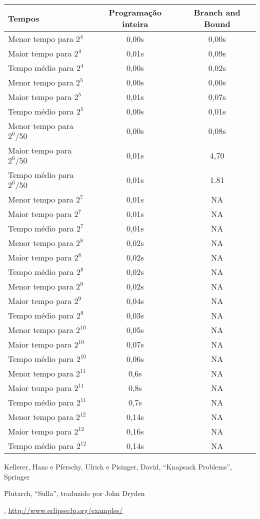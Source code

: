 \documentclass{article}
\begin{document}
\begin{center}
  \bgroup {}
  \begin{tabular}{| l | c | c |}
    \hline Tempos & Programação inteira & Branch and Bound \\ \hline
    \hline Menor tempo para $2^4$ & 0,00s & 0,00s \\ Maior tempo
    para $2^4$ & 0,01s & 0,09s \\ Tempo médio para $2^4$ & 0,00s &
    0,02s \\ \hline

    Menor tempo para $2^5$ & 0,00s & 0,00s \\ Maior tempo para $2^5$
    & 0,01s & 0,07s \\ Tempo médio para $2^5$ & 0,00s & 0,01s
    \\ \hline

    Menor tempo para $2^6/50$ & 0,00s & 0,08s \\ Maior tempo para
    $2^6/50$ & 0,01s & 4,70 \\ Tempo médio para $2^6/50$ & 0,01s &
    1.81 \\ \hline

    Menor tempo para $2^7$ & 0,01s & NA \\ Maior tempo para $2^7$ &
    0,01s & NA \\ Tempo médio para $2^7$ & 0,01s & NA \\ \hline

    Menor tempo para $2^8$ & 0,02s & NA \\ Maior tempo para $2^8$ &
    0,02s & NA \\ Tempo médio para $2^8$ & 0,02s & NA \\ \hline

    Menor tempo para $2^9$ & 0,02s & NA \\ Maior tempo para $2^9$ &
    0,04s & NA \\ Tempo médio para $2^9$ & 0,03s & NA \\ \hline

    Menor tempo para $2^{10}$ & 0,05s & NA \\ Maior tempo para
    $2^{10}$ & 0,07s & NA \\ Tempo médio para $2^{10}$ & 0,06s & NA
    \\ \hline

    Menor tempo para $2^{11}$ & 0,6s & NA \\ Maior tempo para
    $2^{11}$ & 0,8s & NA \\ Tempo médio para $2^{11}$ & 0,7s & NA
    \\ \hline

    Menor tempo para $2^{12}$ & 0,14s & NA \\ Maior tempo para
    $2^{12}$ & 0,16s & NA \\ Tempo médio para $2^{12}$ & 0,14s & NA
    \\ \hline
  \end{tabular}
  \egroup
\end{center}


\begin{thebibliography}{2}

 Kellerer, Hans e Pferschy, Ulrich e Pisinger,
  David, ``Knapsack Problems'', Springer

 Plutarch, ``Sulla'', traduzido por John Dryden

 \eclipse,
  \url{http://www.eclipseclp.org/examples/}

\end{thebibliography}
\end{document}
